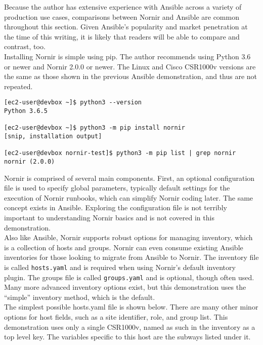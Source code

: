 Because the author has extensive experience with Ansible across a variety of
production use cases, comparisons between Nornir and Ansible are common
throughout this section. Given Ansible's popularity and market penetration at
the time of this writing, it is likely that readers will be able to compare
and contrast, too. \\

Installing Nornir is simple using pip. The author recommends using Python 3.6
or newer and Nornir 2.0.0 or newer. The Linux and Cisco CSR1000v versions are
the same as those shown in the previous Ansible demonstration, and thus are not repeated.

\begin{verbatim}
[ec2-user@devbox ~]$ python3 --version
Python 3.6.5

[ec2-user@devbox ~]$ python3 -m pip install nornir
[snip, installation output]

[ec2-user@devbox nornir-test]$ python3 -m pip list | grep nornir
nornir (2.0.0)
\end{verbatim}

Nornir is comprised of several main components. First, an optional
configuration file is used to specify global parameters, typically default
settings for the execution of Nornir runbooks, which can simplify Nornir
coding later. The same concept exists in Ansible. Exploring the configuration
file is not terribly important to understanding Nornir basics and is not
covered in this demonstration. \\

Also like Ansible, Nornir supports robust options for managing inventory,
which is a collection of hosts and groups. Nornir can even consume existing
Ansible inventories for those looking to migrate from Ansible to Nornir. The
inventory file is called \verb|hosts.yaml| and is required when using Nornir's
default inventory plugin. The groups file is called \verb|groups.yaml| and is
optional, though often used. Many more advanced inventory options exist, but
this demonstration uses the ``simple'' inventory method, which is the default. \\

The simplest possible hosts.yaml file is shown below. There are many other
minor options for host fields, such as a site identifier, role, and group
list. This demonstration uses only a single CSR1000v, named as such in the
inventory as a top level key. The variables specific to this host are the
subways listed under it.

